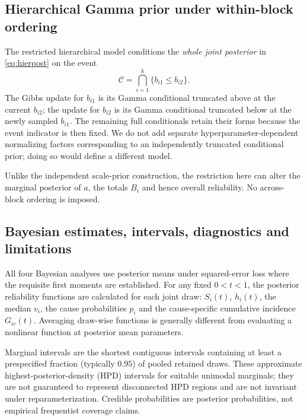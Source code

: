 \documentclass[a4paper,11pt]{article}
\begin{document}
\subsection{Hierarchical Gamma prior under within-block ordering}\label{sec:bayes-hierarchical-restricted}
The restricted hierarchical model conditions the \emph{whole joint posterior} in \eqref{eq:hierpost} on the event
\begin{equation}\label{eq:hier-event}
\mathcal C=\bigcap_{i=1}^k\{b_{i1}\le b_{i2}\}.
\end{equation}
The Gibbs update for $b_{i1}$ is its Gamma conditional truncated above at the current $b_{i2}$; the update for $b_{i2}$ is its Gamma conditional truncated below at the newly sampled $b_{i1}$. The remaining full conditionals retain their forms because the event indicator is then fixed. We do not add separate hyperparameter-dependent normalizing factors corresponding to an independently truncated conditional prior; doing so would define a different model.

Unlike the independent scale-prior construction, the restriction here can alter the marginal posterior of $a$, the totals $B_i$ and hence overall reliability. No across-block ordering is imposed.

\subsection{Bayesian estimates, intervals, diagnostics and limitations}
All four Bayesian analyses use posterior means under squared-error loss where the requisite first moments are established. For any fixed $0<t<1$, the posterior reliability functions are calculated for each joint draw: $S_i(t)$, $h_i(t)$, the median $v_i$, the cause probabilities $p_i$ and the cause-specific cumulative incidence $G_{ic}(t)$. Averaging draw-wise functions is generally different from evaluating a nonlinear function at posterior mean parameters.

Marginal intervals are the shortest contiguous intervals containing at least a prespecified fraction (typically $0.95$) of pooled retained draws. These approximate highest-posterior-density (HPD) intervals for suitable unimodal marginals; they are not guaranteed to represent disconnected HPD regions and are not invariant under reparameterization. Credible probabilities are posterior probabilities, not empirical frequentist coverage claims.
\end{document}
